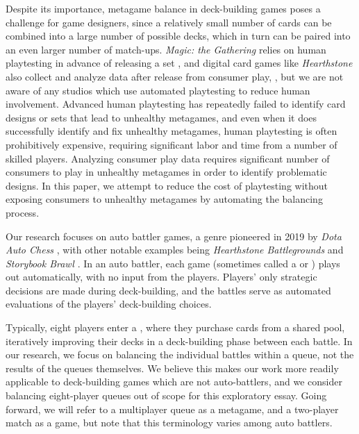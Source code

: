
Despite its importance, metagame balance in deck-building games poses
a challenge for game designers, since a relatively small number of
cards can be combined into a large number of possible decks, which in
turn can be paired into an even larger number of
match-ups. \textit{Magic: the Gathering} relies on human playtesting
in advance of releasing a set \cite{designing-hod-ffl}, and digital
card games like \textit{Hearthstone} also collect and analyze data
after release from consumer play,
\cite{blizzard-gamebalancetalk-keg2019}, but we are not aware of any
studios which use automated playtesting to reduce human involvement.
Advanced human playtesting has repeatedly failed to identify card
designs or sets that lead to unhealthy metagames, and even when it
does successfully identify and fix unhealthy metagames, human
playtesting is often prohibitively expensive, requiring significant
labor and time from a number of skilled players. Analyzing consumer
play data requires significant number of consumers to play in
unhealthy metagames in order to identify problematic designs.
In this paper, we attempt to reduce the cost of playtesting without
exposing consumers to unhealthy metagames by automating the balancing
process.

Our research focuses on auto battler games, a genre pioneered in 2019
by \textit{Dota Auto Chess} \cite{autochess}, with other notable
examples being \textit{Hearthstone Battlegrounds}
\cite{hearthstone-battlegrounds} and \textit{Storybook Brawl}
\cite{storybook-brawl}.
In an auto battler, each game (sometimes called a  or
) plays out automatically, with no input from the
players. Players' only strategic decisions are made during
deck-building, and the battles serve as automated evaluations of the
players' deck-building choices.

Typically, eight players enter a , where they purchase
cards from a shared pool, iteratively improving their decks in a
deck-building phase between each battle. In our research, we focus on
balancing the individual battles within a queue, not the results of
the queues themselves. We believe this makes our work more readily
applicable to deck-building games which are not auto-battlers, and we
consider balancing eight-player queues out of scope for this
exploratory essay.  Going forward, we will refer to a multiplayer
queue as a metagame, and a two-player match as a game, but note that
this terminology varies among auto battlers.

